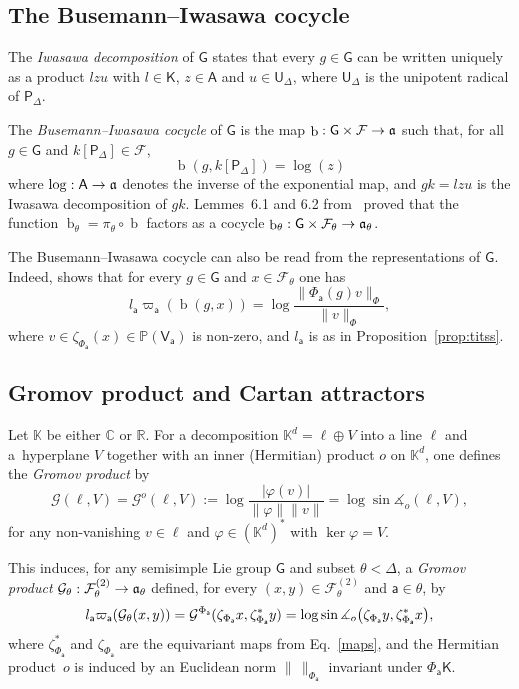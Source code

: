 \documentclass[AHL,Unicode,longabstracts,MathTools]{cedram}
\DeclareMathOperator{\bus}{b}
\renewcommand{\sf}[1]{{\mathsf{#1}}}
\newcommand{\sroot}{{\sf{a}}}
\newcommand{\sfG}{\sf{G}}
\newcommand{\cal}{\mathcal}
\newcommand{\Gr}{\cal{G}}
\newcommand{\posgen}{\cal{F}^{(2)}}
\newcommand{\calF}{\mathcal{F}}
\newcommand{\R}{\mathbb{R}}
\newcommand{\C}{\mathbb{C}}
\renewcommand{\P}{\mathbb{P}}
\newcommand{\K}{\mathbb{K}}
\renewcommand{\t}{\theta}
\newcommand{\simple}{{\sf \Delta}}
\newcommand{\Fund}{\Phi}
\newcommand{\peso}{\varpi}
\renewcommand{\/}{\backslash}
\renewcommand{\angle}{\measuredangle}
\newcommand{\<}{\langle}
\renewcommand{\>}{\rangle}
\renewcommand{\a}{\mathfrak{a}}
\renewcommand*{\to}{\mathchoice{\longrightarrow}{\rightarrow}{\rightarrow}{\rightarrow}}
\let\originalleft\left
\let\originalright\right
\renewcommand{\left}{\mathopen{}\mathclose\bgroup\originalleft}
\renewcommand{\right}{\aftergroup\egroup\originalright}
\begin{document}
\subsection{The Busemann--Iwasawa cocycle}

The \emph{Iwasawa decomposition} of $\sfG$ states that every $g\in\sfG$ can be written uniquely as a product $lzu$ with $l\in\sf K$, $z\in\sf A$ and $u\in\sf U_\simple$, where $\sf U_\simple$ is the unipotent radical of $\sf P_{\simple}$.

The \emph{Busemann--Iwasawa cocycle} of $\sfG$ is the map $\bus:\sfG\times\calF\to\a$ such that, for all $g\in\sfG$ and $k[\sf P_\simple]\in\calF$,
\[
\bus(g,k[\sf P_\simple])=\log(z)
\]
where $\log:\sf A\to \a$ denotes the inverse of the exponential map, and $gk=lzu$ is the Iwasawa decomposition of $gk$. Lemmes~6.1 and 6.2 from~\cite{Quint-PS} proved that the function $\bus_\t=\pi_\t\circ\bus$ factors as a cocycle $\bus_\t:\sfG\times \calF_\t\to\a_\t$.


The Busemann--Iwasawa cocycle can also be read from the representations of $\sfG$. Indeed, \cite[Lemme~6.4]{Quint-PS} shows that for every $g\in\sfG$ and $x\in\calF_\t$ one has
\begin{equation}\label{busnorma}
l_\sroot\peso_\sroot(\bus(g,x))=\log\frac{\|\Fund_\sroot(g)v\|_\Fund}{\|v\|_\Fund},
\end{equation}
where $v\in\zeta_{\Fund_\sroot}(x)\in\P(\sf V_\sroot)$ is non-zero, and $l_\sroot$ is as in Proposition~\ref{prop:titss}.



\subsection{Gromov product and Cartan attractors}\label{GryBus}

Let $\K$ be either $\C$ or $\R$. For a decomposition $\K^d=\ell\oplus V$ into a line $\ell$ and a~hyperplane $V$ together with an inner (Hermitian) product $o$ on $\K^d$, one defines the \emph{Gromov product} by
\[
\Gr(\ell,V)=\Gr^o(\ell,V):=\log\frac{|\varphi(v)|}{\|\varphi\|\|v\|}=\log\sin\angle_o(\ell,V),
\]
for any non-vanishing $v\in\ell$ and $\varphi\in (\K^d)^*$ with $\ker\varphi=V$.



This induces, for any semisimple Lie group $\sfG$ and subset $\t<\Delta$, a \emph{Gromov product} $\Gr_\t:\posgen_\t\to\a_\t$ defined, for every $(x,y)\in\posgen_\t$ and $\sroot\in\t$, by
\[
l_\sroot\peso_\sroot(\Gr_\t(x,y))= \Gr^{\Fund_\sroot}(\zeta_{\Fund_\sroot} x,\zeta_{\Fund_\sroot}^*y)=\log\sin\angle_o\left(\zeta_{\Fund_\sroot} y,\zeta_{\Fund_\sroot}^*x\right),
\]
where $\zeta^*_{\Fund_\sroot}$ and $\zeta_{\Fund_\sroot}$ are the equivariant maps from Eq.~\eqref{maps}, and the Hermitian product~$o$ is induced by an Euclidean norm $\|\,\|_{\Fund_\sroot}$ invariant under $\Fund_\sroot\sf K$.
\end{document}
